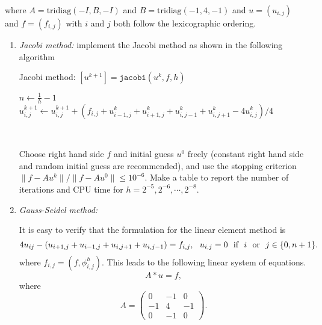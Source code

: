 where ${A} = \text{tridiag}(-{I}, {B}, -{I})$ and ${B} = \text{tridiag}(-1,4,-1)$ and ${u} = ({u}_{i,j})$ and ${f} = ({f}_{i,j})$ with $i$ and $j$ both follow the lexicographic ordering. 
\begin{enumerate}
\item \emph{Jacobi method:}  implement the Jacobi method as shown in the following algorithm
\

\begin{algorithm}
Jacobi method:  $[{u}^{k+1}] = \texttt{jacobi} ({u}^k, {f}, h)$
\begin{algorithmic}[1]
\STATE $n \gets \frac{1}{h} - 1$
\STATE $ {u}^{k+1}_{i,j} \gets {u}^{k+1}_{i,j } + ({f}_{i,j} + {u}^k_{i-1,j} + {u}^k_{i+1,j} + {u}^k_{i,j-1} + {u}^{k}_{i,j+1} -4 {u}^k_{i,j})/4$
\ENDFOR
\ENDFOR
\end{algorithmic}
\end{algorithm}

\

Choose right hand side $f$ and initial guess ${u}^0$ freely (constant right hand side and random initial guess are recommended), and use the stopping criterion $\| {f} - {A} {u}^k \| / \| {f} - {A} {u}^0 \|  \leq 10^{-6} $.  Make a table to report the number of iterations and CPU time for $h = 2^{-5}, 2^{-6}, \cdots, 2^{-8}$.

\item \emph{Gauss-Seidel method:}  




It is easy to verify that the formulation for the linear element method is 
\begin{equation}
  \label{2d-fe0}
4u_{ij}-(u_{i+1,j}+u_{i-1,j}+u_{i,j+1}+u_{i,j-1})=f_{i,j},~~u_{i,j}=0~~\hbox{if}~~i ~~\hbox{or}~~ j\in \{0, n+1\}.
\end{equation}
where ${f}_{i,j} = (f, \phi^h_{i,j})$.  This leads to the following linear system of equations.
\begin{equation*}
A \ast u = f,
\end{equation*}
where
\begin{equation}\label{eq:kernel-A}
A = \begin{pmatrix}
0 & -1 & 0 \\
-1 & 4 & -1 \\
0 & -1 & 0
\end{pmatrix}.
\end{equation}

%
%




\end{enumerate}
